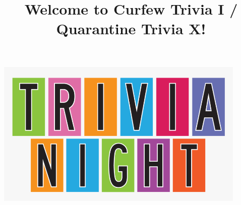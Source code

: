 \documentclass[11pt]{beamer}
\begin{document}
\title{Welcome to Curfew Trivia I / Quarantine Trivia X!}
\date{}

\begin{frame}
\titlepage{}
\begin{center}
\includegraphics[max width=0.9\textwidth,
    max height=0.4\textheight]{Images/triviatitleframelogo.png}
\end{center}
\end{frame}
\end{document}
